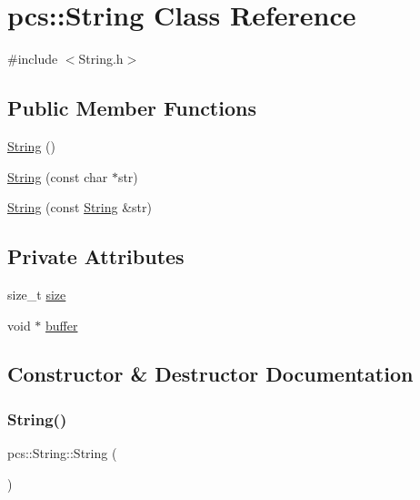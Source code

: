 \hypertarget{classpcs_1_1String}{}\section{pcs\+:\+:String Class Reference}
\label{classpcs_1_1String}


{\ttfamily \#include $<$String.\+h$>$}

\subsection*{Public Member Functions}
\begin{DoxyCompactItemize}
\item 
\hyperlink{classpcs_1_1String_ad0d78ed6faa47e7cd196d11dcad84870}{String} ()
\item 
\hyperlink{classpcs_1_1String_a0e266370956a56ac87d9bdf6fa7f7e4b}{String} (const char $\ast$str)
\item 
\hyperlink{classpcs_1_1String_aa3df984b176aff9c78576c5d47055df2}{String} (const \hyperlink{classpcs_1_1String}{String} \&str)
\end{DoxyCompactItemize}
\subsection*{Private Attributes}
\begin{DoxyCompactItemize}
\item 
size\+\_\+t \hyperlink{classpcs_1_1String_a8a6a126e71a9051529efd7ce1ae807f2}{size}
\item 
void $\ast$ \hyperlink{classpcs_1_1String_ae893563caae28b231f481c6f689b1576}{buffer}
\end{DoxyCompactItemize}


\subsection{Constructor \& Destructor Documentation}
\mbox{\label{classpcs_1_1String_ad0d78ed6faa47e7cd196d11dcad84870}} 
\subsubsection{\texorpdfstring{String()}{String()}\hspace{0.1cm}{\footnotesize\ttfamily [1/3]}}
{\footnotesize\ttfamily pcs\+::\+String\+::\+String (\begin{DoxyParamCaption}{ }\end{DoxyParamCaption})}

